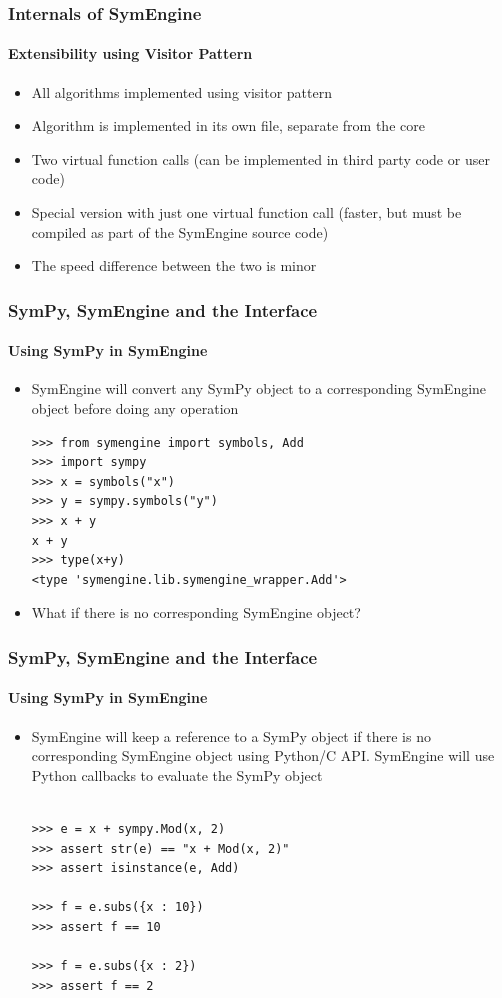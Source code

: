 \documentclass{beamer}
\begin{document}
\begin{frame}
\frametitle{Internals of SymEngine}
\framesubtitle{Extensibility using Visitor Pattern}
\begin{itemize}
    \item All algorithms implemented using visitor pattern
    \item Algorithm is implemented in its own file, separate from the core
    \item Two virtual function calls (can be implemented in third party code or
        user code)
    \item Special version with just one virtual function call (faster, but must
        be compiled as part of the SymEngine source code)
    \item The speed difference between the two is minor
\end{itemize}
\end{frame}


\begin{frame}[fragile]
\frametitle{SymPy, SymEngine and the Interface}
\framesubtitle{Using SymPy in SymEngine}
\begin{itemize}
\item
SymEngine will convert any SymPy object to a corresponding SymEngine object before doing any operation

\begin{verbatim}
>>> from symengine import symbols, Add
>>> import sympy
>>> x = symbols("x")
>>> y = sympy.symbols("y")
>>> x + y
x + y
>>> type(x+y)
<type 'symengine.lib.symengine_wrapper.Add'>
\end{verbatim}
\item
What if there is no corresponding SymEngine object?
\end{itemize}
\end{frame}


\begin{frame}[fragile]
\frametitle{SymPy, SymEngine and the Interface}
\framesubtitle{Using SymPy in SymEngine}
\begin{itemize}
\item
SymEngine will keep a reference to a SymPy object if there is no corresponding SymEngine object using Python/C API.
SymEngine will use Python callbacks to evaluate the SymPy object

\begin{verbatim}

>>> e = x + sympy.Mod(x, 2)
>>> assert str(e) == "x + Mod(x, 2)"
>>> assert isinstance(e, Add)

>>> f = e.subs({x : 10})
>>> assert f == 10

>>> f = e.subs({x : 2})
>>> assert f == 2
\end{verbatim}
\end{itemize}
\end{frame}
\end{document}
